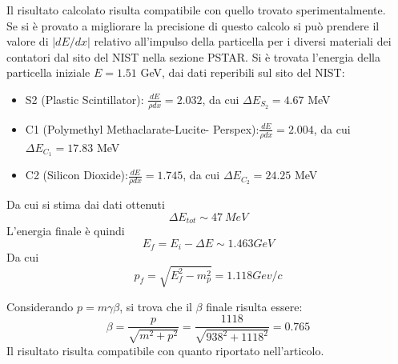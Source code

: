 \documentclass[twoside]{article}
\begin{document}
Il risultato calcolato risulta compatibile con quello trovato sperimentalmente.\\
Se si è provato a migliorare la precisione di questo calcolo si può prendere il valore di $|dE/dx|$ relativo all'impulso della particella per i diversi materiali dei contatori dal sito del NIST nella sezione PSTAR.
Si è trovata l'energia della particella iniziale $E=1.51$ GeV, dai dati reperibili sul sito del NIST:
\begin{itemize}
    \item S2 (Plastic Scintillator): $\frac{dE}{\rho dx}=2.032$, da cui $\Delta E_{S_2}=4.67$ MeV
    \item C1 (Polymethyl Methaclarate-Lucite- Perspex):$\frac{dE}{\rho dx}=2.004$, da cui $\Delta E_{C_1}=17.83$ MeV
    \item C2 (Silicon Dioxide):$\frac{dE}{\rho dx}=1.745$, da cui $\Delta E_{C_2}=24.25$ MeV
\end{itemize}
Da cui si stima dai dati ottenuti
\begin{equation}
    \Delta E_{tot}\sim 47 \: MeV
\end{equation}
L'energia finale è quindi
\begin{equation}
    E_f=E_i-\Delta E\sim 1.463 GeV
\end{equation}
Da cui
\begin{equation}
    p_f=\sqrt{E_f^2-m_p^2}=1.118 Gev/c
\end{equation}

Considerando $p=m\gamma \beta$, si trova che il $\beta$ finale risulta essere:
\begin{equation}
    \beta=\frac{p}{\sqrt{m^2+p^2}} =\frac{1118}{\sqrt{938^2+1118^2}}=0.765
\end{equation}
Il risultato risulta compatibile con quanto riportato nell'articolo.
\end{document}
